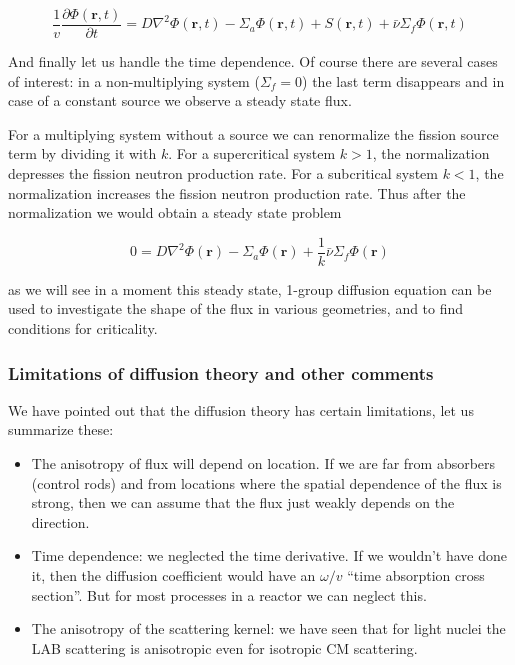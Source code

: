 \begin{equation}
\frac{1}{v}\frac{\partial\Phi(\mathbf{r},t)}{\partial t}=D\nabla^2 \Phi(\mathbf{r},t)-\Sigma_a\Phi(\mathbf{r},t)+S(\mathbf{r},t) 
+\bar\nu\Sigma_f\Phi(\mathbf{r},t)
\end{equation}

And finally let us handle the time dependence. Of course there are several cases of interest: in a non-multiplying system ($\Sigma_f=0$) the last term disappears and in case of a constant source we observe a steady state flux. 

For a multiplying system without a source we can renormalize the fission source term by dividing it with $k$. For a supercritical system $k > 1$, the normalization depresses the fission neutron production rate. For a subcritical system $k < 1$, the normalization increases the fission neutron production rate. Thus after the normalization we would obtain a steady state problem

\begin{equation}
0=D\nabla^2 \Phi(\mathbf{r})-\Sigma_a\Phi(\mathbf{r})+\frac{1}{k}\bar\nu\Sigma_f\Phi(\mathbf{r})
\end{equation}

\noindent as we will see in a moment this steady state, 1-group diffusion equation can be used to investigate the shape of the flux in various geometries, and to find conditions for criticality.

\subsubsection{Limitations of diffusion theory and other comments}

We have pointed out that the diffusion theory has certain limitations, let us summarize these:

\begin{itemize}
\item The anisotropy of flux will depend on location. If we are far from absorbers (control rods) and from locations where the spatial dependence of the flux is strong, then we can assume that the flux just weakly depends on the direction.

\item Time dependence: we neglected the time derivative. If we wouldn't have done it, then the diffusion coefficient would have an $\omega/v$ ``time absorption cross section''. But for most processes in a reactor we can neglect this.

\item The anisotropy of the scattering kernel: we have seen that for light nuclei the LAB scattering is anisotropic even for isotropic CM scattering. 
\end{itemize}


